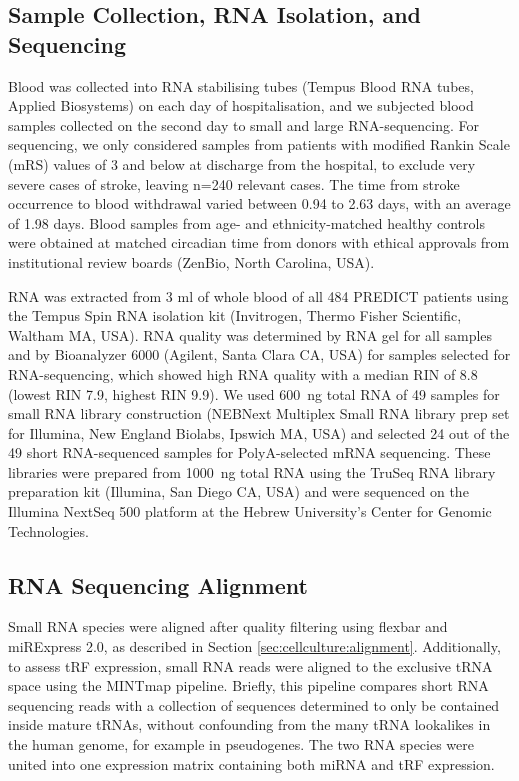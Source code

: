 \begin{method}
\subsection{Sample Collection, RNA Isolation, and Sequencing}
Blood was collected into RNA stabilising tubes (Tempus Blood RNA tubes, Applied Biosystems) on each day of hospitalisation, and we subjected blood samples collected on the second day to small and large RNA-sequencing. For sequencing, we only considered samples from patients with modified Rankin Scale (mRS) values of 3 and below at discharge from the hospital, to exclude very severe cases of stroke, leaving n=240 relevant cases. The time from stroke occurrence to blood withdrawal varied between 0.94 to 2.63 days, with an average of 1.98 days. Blood samples from age- and ethnicity-matched healthy controls were obtained at matched circadian time from donors with ethical approvals from institutional review boards (ZenBio, North Carolina, USA).

RNA was extracted from 3 ml of whole blood of all 484 PREDICT patients using the Tempus Spin RNA isolation kit (Invitrogen, Thermo Fisher Scientific, Waltham MA, USA). RNA quality was determined by RNA gel for all samples and by Bioanalyzer 6000 (Agilent, Santa Clara CA, USA) for samples selected for RNA-sequencing, which showed high RNA quality with a median RIN of 8.8 (lowest RIN 7.9, highest RIN 9.9). We used \SI{600}{\nano\gram} total RNA of 49 samples for small RNA library construction (NEBNext Multiplex Small RNA library prep set for Illumina, New England Biolabs, Ipswich MA, USA) and selected 24 out of the 49 short RNA-sequenced samples for PolyA-selected mRNA sequencing. These libraries were prepared from \SI{1000}{\nano\gram} total RNA using the TruSeq RNA library preparation kit (Illumina, San Diego CA, USA) and were sequenced on the Illumina NextSeq 500 platform at the Hebrew University’s Center for Genomic Technologies.

\subsection{RNA Sequencing Alignment} \label{sec:stroke:alignment}
Small RNA species were aligned after quality filtering using flexbar and miRExpress 2.0, as described in Section \ref{sec:cellculture:alignment}. Additionally, to assess tRF expression, small RNA reads were aligned to the exclusive tRNA space using the MINTmap pipeline.\cite{Loher2017} Briefly, this pipeline compares short RNA sequencing reads with a collection of sequences determined to only be contained inside mature tRNAs, without confounding from the many tRNA lookalikes in the human genome, for example in pseudogenes. The two RNA species were united into one expression matrix containing both miRNA and tRF expression.


\end{method}
